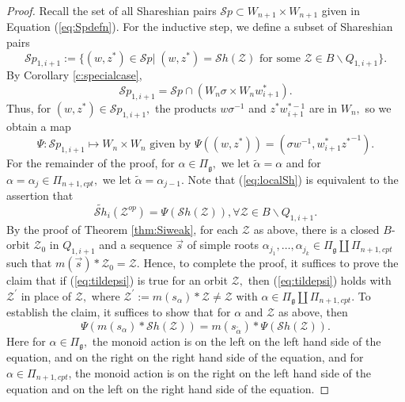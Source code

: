 \documentclass[12pt]{amsart}
\numberwithin{equation}{section}
\newcommand{\cZ}{{\mathcal Z}}
\newcommand{\alphatilde}{{\tilde{\alpha}}}
\newcommand{\Wn}{{W}_n}
\newcommand{\fg}{\mbox{${\mathfrak g}$}}
\newcommand{\ms}{m(s_{\alpha})}
\newcommand{\Sh}{\mathcal{S}h}
\newcommand{\Sp}{\mathcal{S}p}
\begin{document}
\begin{proof}
Recall the set of all Shareshian pairs $\Sp\subset W_{n+1}\times W_{n+1}$ given in Equation (\ref{eq:Spdefn}).  
For the inductive step, we define a subset of Shareshian pairs 
$$\Sp_{1,i+1}:=\{(w, z^{*})\in \Sp|\; (w, z^{*})=\Sh(\cZ)\mbox{ for some } \cZ\in B\backslash Q_{1,i+1}\}.$$  
By Corollary \ref{c:specialcase},  
 \begin{equation}\label{eq:SHcoset}
  \Sp_{1,i+1}=\Sp\cap (\Wn \sigma\times \Wn w_{i+1}^{*}).
 \end{equation}
 Thus, for $(w,z^{*}) \in \Sp_{1,i+1},$ the products $w \sigma^{-1}$ and $z^{*}{w_{i+1}^{*-1}}$ are in $\Wn,$ so we obtain a map 
 \begin{equation}\label{eq:Psidefn}
 \Psi: \Sp_{1,i+1}\mapsto \Wn\times \Wn\mbox{ given by }
 \Psi((w,z^{*}))=(\sigma  w^{-1}, w_{i+1}^{*}{z^{*}}^{-1}).
 \end{equation}
For the remainder of the proof, for $\alpha \in \Pi_{\fg},$ we let $\alphatilde=\alpha$ and for $\alpha=\alpha_j \in \Pi_{n+1,cpt},$ we let $\alphatilde = \alpha_{j-1}.$
 Note that (\ref{eq:localSh}) is equivalent to the assertion that
\begin{equation}\label{eq:tildepsi}
 \widetilde{\Sh}_{i}(\cZ^{op})=\Psi(\Sh(\cZ)), \forall \cZ \in B\backslash Q_{1,i+1}.
\end{equation}
By the proof of Theorem \ref{thm:Siweak}, for each $\cZ$ as above, there is a closed $B$-orbit ${\cZ}_0$ in $Q_{1,i+1}$ and a sequence $\vec{s}$ of simple roots $\alpha_{j_1}, \dots, \alpha_{j_k} \in \Pi_{\fg}\coprod \Pi_{n+1,cpt}$ such that $m(\vec{s})*{\cZ}_0=\cZ.$  Hence, to complete the proof, it suffices to prove the claim that if (\ref{eq:tildepsi}) is true for an orbit $\cZ,$ then (\ref{eq:tildepsi}) holds with $\cZ^{\prime}$ in place of $\cZ,$ where $\cZ^{\prime}:=\ms*\cZ\neq \cZ$ with $\alpha \in\Pi_{\fg}\coprod \Pi_{n+1,cpt}.$ To establish the claim, it suffices to show that for $\alpha$ and $\cZ$ as above, then
 \begin{equation}\label{eq:Psiinter}
\Psi(\ms*\Sh(\cZ))= m(s_{\alphatilde})*\Psi(\Sh(\cZ)).
 \end{equation}
Here for $\alpha\in \Pi_{\fg},$ the monoid action is on the left  on the left hand side of the equation, and on the right on the right hand side of the equation, and for $\alpha \in \Pi_{n+1,cpt}$, the monoid action is on the right on the left hand side of the equation and on the left on the right hand side of the equation. 

\end{proof}
\end{document}
